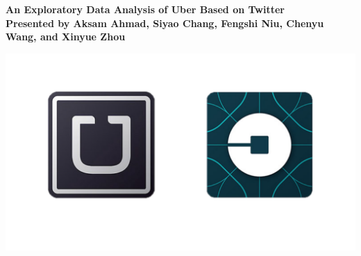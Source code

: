 \documentclass[a222,landscape]{a0poster}
\begin{document}


\begin{minipage}[b]{0.75\linewidth}
\veryHuge \color{NavyBlue} \textbf{An Exploratory Data Analysis of Uber Based on Twitter} \color{Black}\\ %
\huge \textbf{Presented by Aksam Ahmad, Siyao Chang, Fengshi Niu, Chenyu Wang, and Xinyue Zhou}\\
\end{minipage}
\begin{minipage}[b]{0.25\linewidth}
\raggedleft\includegraphics[width=0.5\linewidth]{../figures/Poster_OldNewLogo.png}
\end{minipage}


\vspace{0.5 cm} %

\end{document}
